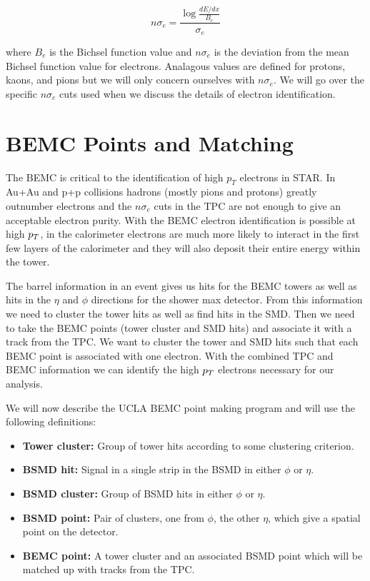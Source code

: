 \begin{equation}\label{eq:nsigmae}
n\sigma_e = \frac{\log{\frac{dE/dx}{B_e}}}{\sigma_e}
\end{equation}

where $B_e$ is the Bichsel function value and $n\sigma_e$ is the deviation from the mean Bichsel function value for electrons. Analagous values are defined for protons, kaons, and pions but we will only concern ourselves with $n\sigma_e$. We will go over the specific $n\sigma_e$ cuts used when we discuss the details of electron identification. 

\section{BEMC Points and Matching}

The BEMC is critical to the identification of high $p_T$ electrons in STAR. In Au+Au and p+p collisions hadrons (mostly pions and protons) greatly outnumber electrons and the $n\sigma_e$ cuts in the TPC are not enough to give an acceptable electron purity. With the BEMC electron identification is possible at high $p_{T}$, in the calorimeter electrons are much more likely to interact in the first few layers of the calorimeter and they will also deposit their entire energy within the tower. 

The barrel information in an event gives us hits for the BEMC towers as well as hits in the $\eta$ and $\phi$ directions for the shower max detector. From this information we need to cluster the tower hits as well as find hits in the SMD. Then we need to take the BEMC points (tower cluster and SMD hits) and associate it with a track from the TPC. We want to cluster the tower and SMD hits such that each BEMC point is associated with one electron. With the combined TPC and BEMC information we can identify the high $p_{T}$ electrons necessary for our analysis.

We will now describe the UCLA BEMC point making program and will use the following definitions: 

\begin{itemize}
\item \textbf{Tower cluster:} Group of tower hits according to some clustering criterion.
\item \textbf{BSMD hit:} Signal in a single strip in the BSMD in either $\phi$ or $\eta$.
\item \textbf{BSMD cluster:} Group of BSMD hits in either $\phi$ or $\eta$.
\item \textbf{BSMD point:} Pair of clusters, one from $\phi$, the other $\eta$, which give a spatial point on the detector.
\item \textbf{BEMC point:} A tower cluster and an associated BSMD point which will be matched up with tracks from the TPC.
\end{itemize}

